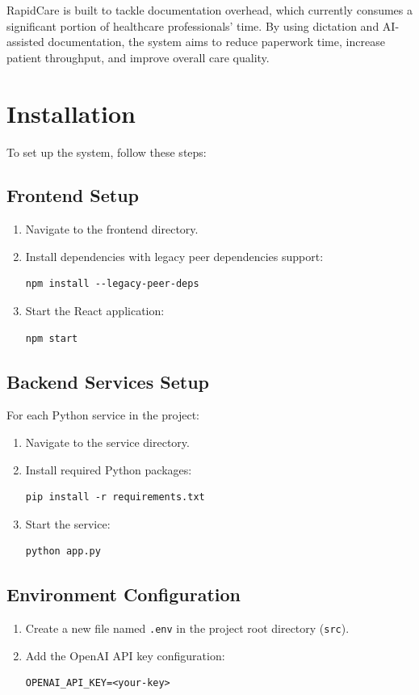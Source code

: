 \documentclass[12pt, titlepage]{article}
\begin{document}
RapidCare is built to tackle documentation overhead, which currently consumes a significant portion of healthcare professionals' time. By using dictation and AI-assisted documentation, the system aims to reduce paperwork time, increase patient throughput, and improve overall care quality.

\newpage

\section{Installation}
To set up the system, follow these steps:

\subsection{Frontend Setup}
\begin{enumerate}
\item Navigate to the frontend directory.
\item Install dependencies with legacy peer dependencies support:
\begin{verbatim}
npm install --legacy-peer-deps
\end{verbatim}
\item Start the React application:
\begin{verbatim}
npm start
\end{verbatim}
\end{enumerate}

\subsection{Backend Services Setup}
For each Python service in the project:
\begin{enumerate}
\item Navigate to the service directory.
\item Install required Python packages:
\begin{verbatim}
pip install -r requirements.txt
\end{verbatim}
\item Start the service:
\begin{verbatim}
python app.py
\end{verbatim}
\end{enumerate}

\subsection{Environment Configuration}
\begin{enumerate}
\item Create a new file named \texttt{.env} in the project root directory (\texttt{src}).
\item Add the OpenAI API key configuration:
\begin{verbatim}
OPENAI_API_KEY=<your-key>
\end{verbatim}
\end{enumerate}
\end{document}
